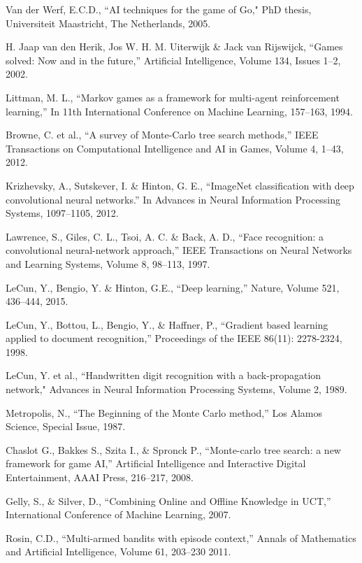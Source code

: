 \documentclass[conference]{IEEEtran}
\begin{document}
\begin{thebibliography}{}
 Van der Werf, E.C.D., ``AI techniques for the game of Go," PhD thesis, Universiteit Maastricht, The Netherlands, 2005.

 H. Jaap van den Herik, Jos W. H. M. Uiterwijk \& Jack van Rijswijck, ``Games solved: Now and in the future,'' Artificial Intelligence, Volume 134, Issues 1–2, 2002.

 Littman, M. L., ``Markov games as a framework for multi-agent reinforcement learning,'' In 11th International Conference on Machine Learning, 157–163, 1994.

 Browne, C. et al., ``A survey of Monte-Carlo tree search methods,'' IEEE Transactions on Computational Intelligence and AI in Games, Volume 4, 1–43, 2012.

 Krizhevsky, A., Sutskever, I. \& Hinton, G. E., ``ImageNet classification with deep convolutional neural networks.'' In Advances in Neural Information Processing Systems, 1097–1105, 2012. 

Lawrence, S., Giles, C. L., Tsoi, A. C. \& Back, A. D., ``Face recognition: a convolutional neural-network approach,'' IEEE Transactions on Neural Networks and Learning Systems, Volume 8, 98–113, 1997.

 LeCun, Y., Bengio, Y. \& Hinton, G.E., ``Deep learning,'' Nature, Volume 521, 436–444, 2015.

 LeCun, Y., Bottou, L., Bengio, Y., \& Haffner, P., ``Gradient based learning applied to document recognition,'' Proceedings of the IEEE 86(11): 2278-2324, 1998.

 LeCun, Y. et al., ``Handwritten digit recognition with a back-propagation network," Advances in Neural Information Processing Systems, Volume 2, 1989.

 Metropolis, N., ``The Beginning of the Monte Carlo method,'' Los Alamos Science, Special Issue, 1987.

 Chaslot G., Bakkes S., Szita I., \& Spronck P., ``Monte-carlo tree search: a new framework for game AI,'' Artificial Intelligence and Interactive Digital Entertainment, AAAI Press, 216–217, 2008.

 Gelly, S., \& Silver, D., ``Combining Online and Offline Knowledge in UCT,'' International Conference of Machine Learning, 2007.

 Rosin, C.D., ``Multi-armed bandits with episode context,'' Annals of Mathematics and Artificial Intelligence, Volume 61, 203–230 2011.


\end{thebibliography}
\end{document}
